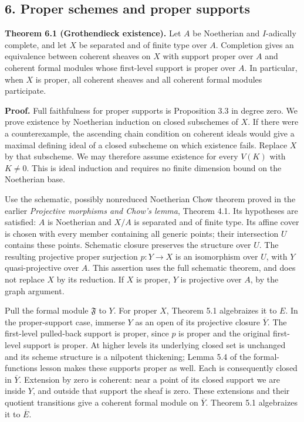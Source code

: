 \documentclass[11pt]{article}
\begin{document}
\subsection{6. Proper schemes and proper
supports}\label{proper-schemes-and-proper-supports}

\textbf{Theorem 6.1 (Grothendieck existence).} Let \(A\) be Noetherian
and \(I\)-adically complete, and let \(X\) be separated and of finite
type over \(A\). Completion gives an equivalence between coherent
sheaves on \(X\) with support proper over \(A\) and coherent formal
modules whose first-level support is proper over \(A\). In particular,
when \(X\) is proper, all coherent sheaves and all coherent formal
modules participate.

\textbf{Proof.} Full faithfulness for proper supports is Proposition 3.3
in degree zero. We prove existence by Noetherian induction on closed
subschemes of \(X\). If there were a counterexample, the ascending chain
condition on coherent ideals would give a maximal defining ideal of a
closed subscheme on which existence fails. Replace \(X\) by that
subscheme. We may therefore assume existence for every \(V(K)\) with
\(K\ne0\). This is ideal induction and requires no finite dimension
bound on the Noetherian base.

Use the schematic, possibly nonreduced Noetherian Chow theorem proved in
the earlier \emph{Projective morphisms and Chow's lemma}, Theorem 4.1.
Its hypotheses are satisfied: \(A\) is Noetherian and \(X/A\) is
separated and of finite type. Its affine cover is chosen with every
member containing all generic points; their intersection \(U\) contains
these points. Schematic closure preserves the structure over \(U\). The
resulting projective proper surjection \(p:Y\to X\) is an isomorphism
over \(U\), with \(Y\) quasi-projective over \(A\). This assertion uses
the full schematic theorem, and does not replace \(X\) by its reduction.
If \(X\) is proper, \(Y\) is projective over \(A\), by the graph
argument.

Pull the formal module \(\mathfrak F\) to \(Y\). For proper \(X\),
Theorem 5.1 algebraizes it to \(E\). In the proper-support case, immerse
\(Y\) as an open of its projective closure \(\overline Y\). The
first-level pulled-back support is proper, since \(p\) is proper and the
original first-level support is proper. At higher levels its underlying
closed set is unchanged and its scheme structure is a nilpotent
thickening; Lemma 5.4 of the formal-functions lesson makes these
supports proper as well. Each is consequently closed in \(\overline Y\).
Extension by zero is coherent: near a point of its closed support we are
inside \(Y\), and outside that support the sheaf is zero. These
extensions and their quotient transitions give a coherent formal module
on \(\overline Y\). Theorem 5.1 algebraizes it to \(\overline E\).
\end{document}
